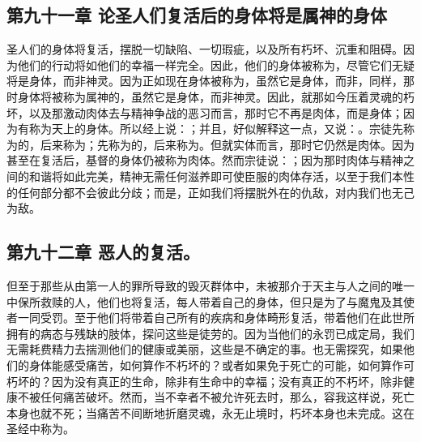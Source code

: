 
\subsection{第九十一章 论圣人们复活后的身体将是属神的身体}

圣人们的身体将复活，摆脱一切缺陷、一切瑕疵，以及所有朽坏、沉重和阻碍。因为他们的行动将如他们的幸福一样完全。因此，他们的身体被称为，尽管它们无疑将是身体，而非神灵。因为正如现在身体被称为，虽然它是身体，而非，同样，那时身体将被称为属神的，虽然它是身体，而非神灵。因此，就那如今压着灵魂的朽坏，以及那激动肉体去与精神争战的恶习而言，那时它不再是肉体，而是身体；因为有称为天上的身体。所以经上说：；并且，好似解释这一点，又说：。宗徒先称为的，后来称为；先称为的，后来称为。但就实体而言，那时它仍然是肉体。因为甚至在复活后，基督的身体仍被称为肉体。然而宗徒说：；因为那时肉体与精神之间的和谐将如此完美，精神无需任何滋养即可使臣服的肉体存活，以至于我们本性的任何部分都不会彼此分歧；而是，正如我们将摆脱外在的仇敌，对内我们也无己为敌。\par


\subsection{第九十二章 恶人的复活。}

但至于那些从由第一人的罪所导致的毁灭群体中，未被那介于天主与人之间的唯一中保所救赎的人，他们也将复活，每人带着自己的身体，但只是为了与魔鬼及其使者一同受罚。至于他们将带着自己所有的疾病和身体畸形复活，带着他们在此世所拥有的病态与残缺的肢体，探问这些是徒劳的。因为当他们的永罚已成定局，我们无需耗费精力去揣测他们的健康或美丽，这些是不确定的事。也无需探究，如果他们的身体能感受痛苦，如何算作不朽坏的？或者如果免于死亡的可能，如何算作可朽坏的？因为没有真正的生命，除非有生命中的幸福；没有真正的不朽坏，除非健康不被任何痛苦破坏。然而，当不幸者不被允许死去时，那么，容我这样说，死亡本身也就不死；当痛苦不间断地折磨灵魂，永无止境时，朽坏本身也未完成。这在圣经中称为。\par


